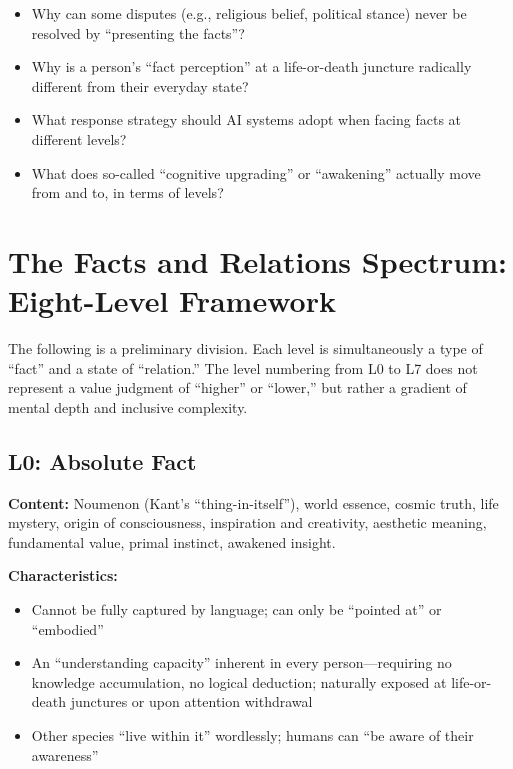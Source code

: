 \documentclass[11pt,a4paper]{article}
\begin{document}
\begin{itemize}[nosep]
    \item Why can some disputes (e.g., religious belief, political stance) never be resolved by ``presenting the facts''?
    \item Why is a person's ``fact perception'' at a life-or-death juncture radically different from their everyday state?
    \item What response strategy should AI systems adopt when facing facts at different levels?
    \item What does so-called ``cognitive upgrading'' or ``awakening'' actually move from and to, in terms of levels?
\end{itemize}

\section{The Facts and Relations Spectrum: Eight-Level Framework}

The following is a preliminary division. Each level is simultaneously a type of ``fact'' and a state of ``relation.'' The level numbering from L0 to L7 does not represent a value judgment of ``higher'' or ``lower,'' but rather a gradient of mental depth and inclusive complexity.

\subsection{L0: Absolute Fact}

\textbf{Content:} Noumenon (Kant's ``thing-in-itself''), world essence, cosmic truth, life mystery, origin of consciousness, inspiration and creativity, aesthetic meaning, fundamental value, primal instinct, awakened insight.

\textbf{Characteristics:}
\begin{itemize}[nosep]
    \item Cannot be fully captured by language; can only be ``pointed at'' or ``embodied''
    \item An ``understanding capacity'' inherent in every person---requiring no knowledge accumulation, no logical deduction; naturally exposed at life-or-death junctures or upon attention withdrawal
    \item Other species ``live within it'' wordlessly; humans can ``be aware of their awareness''
\end{itemize}
\end{document}
